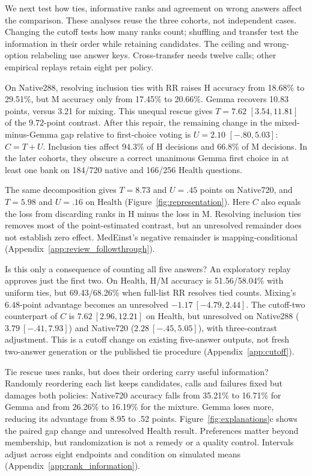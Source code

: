\documentclass{article}
\begin{document}
We next test how ties, informative ranks and agreement on wrong answers affect the comparison. These analyses reuse the three cohorts, not independent cases. Changing the cutoff tests how many ranks count; shuffling and transfer test the information in their order while retaining candidates. The ceiling and wrong-option relabeling use answer keys. Cross-transfer needs twelve calls; other empirical replays retain eight per policy.

On Native288, resolving inclusion ties with RR raises H accuracy from 18.68\% to 29.51\%, but M accuracy only from 17.45\% to 20.66\%. Gemma recovers 10.83 points, versus 3.21 for mixing. This unequal rescue gives $T=7.62$ $[3.54,11.81]$ of the $9.72$-point contrast. After this repair, the remaining change in the mixed-minus-Gemma gap relative to first-choice voting is $U=2.10$ $[-.80,5.03]$: $C=T+U$. Inclusion ties affect 94.3\% of H decisions and 66.8\% of M decisions. In the later cohorts, they obscure a correct unanimous Gemma first choice in at least one bank on 184/720 native and 166/256 Health questions.

The same decomposition gives $T=8.73$ and $U=.45$ points on Native720, and $T=5.98$ and $U=.16$ on Health (Figure~\ref{fig:representation}). Here $C$ also equals the loss from discarding ranks in H minus the loss in M. Resolving inclusion ties removes most of the point-estimated contrast, but an unresolved remainder does not establish zero effect. MedEinst's negative remainder is mapping-conditional (Appendix~\ref{app:review_followthrough}).

Is this only a consequence of counting all five answers? An exploratory replay approves just the first two. On Health, H/M accuracy is 51.56/58.04\% with uniform ties, but 69.43/68.26\% when full-list RR resolves tied counts. Mixing's $6.48$-point advantage becomes an unresolved $-1.17\ [-4.79,2.44]$. The cutoff-two counterpart of $C$ is $7.62\ [2.96,12.21]$ on Health, but unresolved on Native288 ($3.79\ [-.41,7.93]$) and Native720 ($2.28\ [-.45,5.05]$), with three-contrast adjustment. This is a cutoff change on existing five-answer outputs, not fresh two-answer generation or the published tie procedure (Appendix~\ref{app:cutoff}).

Tie rescue uses ranks, but does their ordering carry useful information? Randomly reordering each list keeps candidates, calls and failures fixed but damages both policies: Native720 accuracy falls from 35.21\% to 16.71\% for Gemma and from 26.26\% to 16.19\% for the mixture. Gemma loses more, reducing its advantage from 8.95 to .52 points. Figure~\ref{fig:explanations}c shows the paired gap change and unresolved Health result. Preferences matter beyond membership, but randomization is not a remedy or a quality control. Intervals adjust across eight endpoints and condition on simulated means (Appendix~\ref{app:rank_information}).
\end{document}
